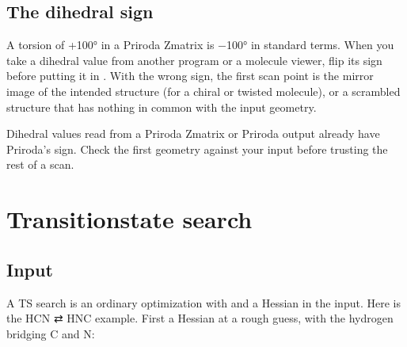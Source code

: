 \documentclass[letterpaper,10pt,english,openany,oneside]{sphinxmanual}
\begin{document}
\subsection{The dihedral sign}
\label{\detokenize{tasks/ts-irc-scan:the-dihedral-sign}}
\sphinxAtStartPar
{}
A torsion of +100° in a Priroda Z\sphinxhyphen{}matrix is −100° in standard terms. When you take a dihedral value from another
program or a molecule viewer, flip its sign before putting it in . With the wrong sign, the first scan point
is the mirror image of the intended structure (for a chiral or twisted molecule), or a scrambled structure that has
nothing in common with the input geometry.



\sphinxAtStartPar
Dihedral values read from a Priroda Z\sphinxhyphen{}matrix or Priroda output already have Priroda’s sign. Check the first
 geometry against your input before trusting the rest of a scan.




\section{Transition\sphinxhyphen{}state search}
\label{\detokenize{tasks/ts-irc-scan:transition-state-search}}

\subsection{Input}
\label{\detokenize{tasks/ts-irc-scan:id1}}
\sphinxAtStartPar
A TS search is an ordinary optimization with {\hyperref[\detokenize{reference/optimize:optimize-saddle}]{}} and a Hessian in the input. Here is
the HCN ⇄ HNC example. First a Hessian at a rough guess, with the hydrogen bridging C and N:
\end{document}
